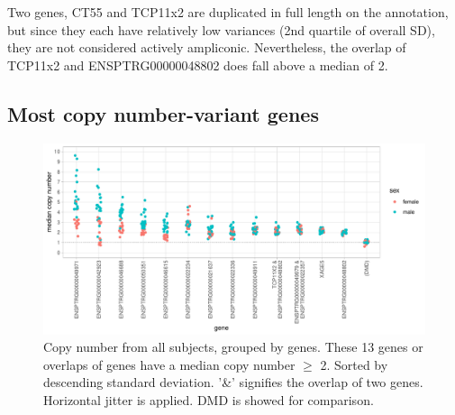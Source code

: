Two genes, {\footnotesize CT55} and {\footnotesize TCP11x2} are duplicated in full length on the annotation, but since they each have relatively low variances (2nd quartile of overall SD), they are not considered actively ampliconic. Nevertheless, the overlap of TCP11x2 and ENSPTRG00000048802 does fall above a median of 2. %




\subsection*{Most copy number-variant genes}


\begin{figure}[h] 
  \centering
  \includegraphics[scale=0.78]{figures/fig_main_3.pdf}
  \caption{Copy number from all subjects, grouped by genes. %
  These 13 genes or overlaps of genes have a median copy number $\geq$ 2. Sorted by descending standard deviation. '\&' signifies the overlap of two genes. Horizontal jitter is applied. DMD is showed for comparison. }
  \label{fig:fig_main}
\end{figure}




